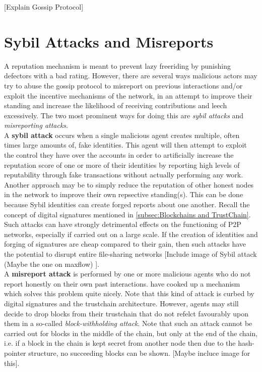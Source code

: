 \documentclass[11pt,a4paper]{article}
\theoremstyle{definition}
\theoremstyle{theorem}
\theoremstyle{proposition}
\theoremstyle{corollary}
\theoremstyle{lemma}
\theoremstyle{example}
\theoremstyle{remark}
\begin{document}
\noindent{}\begin{center} [Explain Gossip Protocol] \end{center}

\section{Sybil Attacks and Misreports}
\label{sec:Sybil Attacks and Misreports}
\noindent{}A reputation mechanism is meant to prevent lazy freeriding by punishing defectors with a bad rating. However, there are several ways malicious actors may try to abuse the gossip protocol to misreport on previous interactions and/or exploit the incentive mechanisms of the network, in an attempt to improve their standing and increase the likelihood of receiving contributions and leech excessively. The two most prominent ways for doing this are {\it sybil attacks} and {\it misreporting attacks}. \vspace{1em}\\

\noindent{}A {\bf sybil attack} occurs when a single malicious agent creates multiple, often times large amounts of, fake identities. This agent will then attempt to exploit the control they have over the accounts in order to artificially increase the reputation score of one or more of their identities by reporting high levels of reputability through fake transactions without actually performing any work. Another approach may be to simply reduce the reputation of other honest nodes in the network to improve their own repsective standing(s). This can be done because Sybil identities can create forged reports about one another. Recall the concept of digital signatures mentioned in \ref{subsec:Blockchains and TrustChain}. Such attacks can have strongly detrimental effects on the functioning of P2P networks, especially if carried out on a large scale. If the creation of identities and forging of signatures are cheap compared to their gain, then such attacks have the potential to disrupt entire file-sharing networks [Include image of Sybil attack (Maybe the one on maxflow) ].  \vspace{1em}\\

\noindent{}A {\bf misreport attack} is performed by one or more malicious agents who do not report honestly on their own past interactions. \cite{DropEdge} have cooked up a mechanism which solves this problem quite nicely. Note that this kind of attack is curbed by digital signatures and the trustchain architecture. However, agents may still decide to drop blocks from their trustchain that do not refelct favourably upon them in a so-called {\it block-withholding attack}. Note that such an attack cannot be carried out for blocks in the middle of the chain, but only at the end of the chain, i.e. if a block in the chain is kept secret from another node then due to the hash-pointer structure, no succeeding blocks can be shown. [Maybe incluce image for this].\vspace{1em}\\ 
\end{document}
